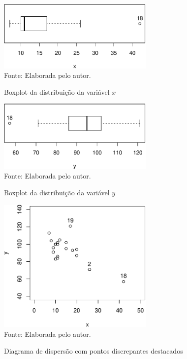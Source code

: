 \begin{figure}[h]
\begin{center}
\caption{Boxplot da distribuição da variável $x$}
\label{fig:chap02_boxplot_x-crop}
\includegraphics[width=3in]{figuras/chap02_boxplot_x-crop.pdf}
\\ Fonte: Elaborada pelo autor.
\end{center}
\end{figure}


\begin{figure}[h]
\begin{center}
\caption{Boxplot da distribuição da variável $y$}
\label{fig:chap02_boxplot_y-crop}
\includegraphics[width=3in]{figuras/chap02_boxplot_y-crop.pdf}
\\ Fonte: Elaborada pelo autor.
\end{center}
\end{figure}

\begin{figure}[h]
\begin{center}
\caption{Diagrama de dispersão com pontos discrepantes destacados}
\label{fig:chap02_simple_scatter}
\includegraphics[width=3in]{figuras/chap02_simple_scatter.pdf}
\\ Fonte: Elaborada pelo autor.
\end{center}
\end{figure}

